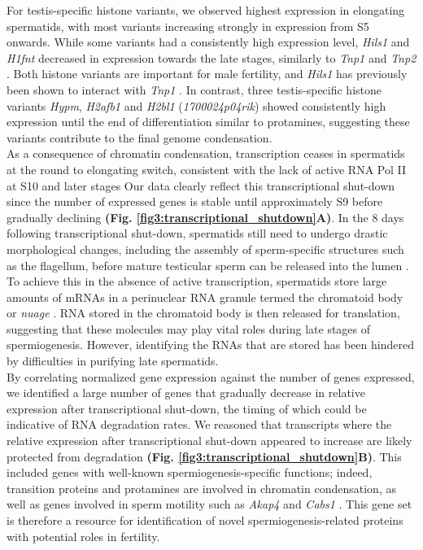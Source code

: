 For testis-specific histone variants, we observed highest expression in elongating spermatids, with most variants increasing strongly in expression from S5 onwards. While some variants had a consistently high expression level, \textit{Hils1} and \textit{H1fnt} decreased in expression towards the late stages, similarly to \textit{Tnp1} and \textit{Tnp2} \citep{Zhao2004}. Both histone variants are important for male fertility, and \textit{Hils1} has previously been shown to interact with \textit{Tnp1} \citep{Tanaka2005}. In contrast, three testis-specific histone variants \textit{Hypm}, \textit{H2afb1} and \textit{H2bl1} (\textit{1700024p04rik}) showed consistently high expression until the end of differentiation similar to protamines, suggesting these variants contribute to the final genome condensation.\\

As a consequence of chromatin condensation, transcription ceases in spermatids at the round to elongating switch, consistent with the lack of active RNA Pol II at S10 and later stages %
Our data clearly reflect this transcriptional shut-down since the number of expressed genes is stable until approximately S9 before gradually declining \textbf{(Fig. \ref{fig3:transcriptional_shutdown}A)}.
In the 8 days following transcriptional shut-down, spermatids still need to undergo drastic morphological changes, including the assembly of sperm-specific structures such as the flagellum, before mature testicular sperm can be released into the lumen \citep{ODonnell2014}. To achieve this in the absence of active transcription, spermatids store large amounts of mRNAs in a perinuclear RNA granule termed the chromatoid body or \emph{nuage} \citep{Kotaja2007}. RNA stored in the chromatoid body is then released for translation, suggesting that these molecules may play vital roles during late stages of spermiogenesis. However, identifying the RNAs that are stored has been hindered by difficulties in purifying late spermatids. \\

By correlating normalized gene expression against the number of genes expressed, we identified a large number of genes that gradually decrease in relative expression after transcriptional shut-down, the timing of which could be indicative of RNA degradation rates. We reasoned that transcripts where the relative expression after transcriptional shut-down appeared to increase are likely protected from degradation \textbf{(Fig. \ref{fig3:transcriptional_shutdown}B)}. This included genes with well-known spermiogenesis-specific functions; indeed, transition proteins and protamines are involved in chromatin condensation, as well as genes involved in sperm motility such as \textit{Akap4} and \textit{Cabs1} \citep{Kawashima2009, Miki2002}. This gene set is therefore a resource for identification of novel spermiogenesis-related proteins with potential roles in fertility.

